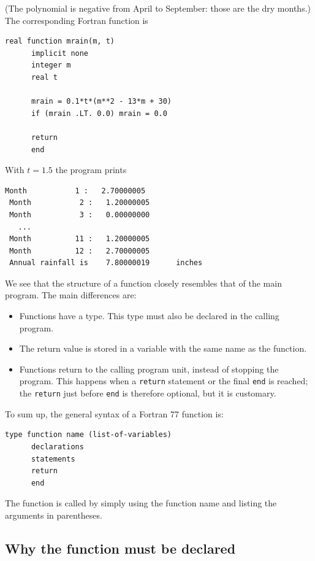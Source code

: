 (The polynomial is negative from April to September: those are the dry months.) The corresponding Fortran function is

\begin{lstlisting}[style=fortran77]
      real function mrain(m, t)
      implicit none
      integer m
      real t

      mrain = 0.1*t*(m**2 - 13*m + 30)
      if (mrain .LT. 0.0) mrain = 0.0

      return
      end
\end{lstlisting}

With $t = 1.5$ the program prints

\begin{lstlisting}[style=output]
 Month           1 :   2.70000005
 Month           2 :   1.20000005
 Month           3 :   0.00000000
   ...
 Month          11 :   1.20000005
 Month          12 :   2.70000005
 Annual rainfall is    7.80000019      inches
\end{lstlisting}

We see that the structure of a function closely resembles that of the main program. The main differences are:

\begin{itemize}
    \item Functions have a type. This type must also be declared in the calling program.
    \item The return value is stored in a variable with the same name as the function.
    \item Functions return to the calling program unit, instead of stopping the program. This happens when a \texttt{return} statement or the final \texttt{end} is reached; the \texttt{return} just before \texttt{end} is therefore optional, but it is customary.
\end{itemize}

To sum up, the general syntax of a Fortran 77 function is:

\begin{lstlisting}[style=fortran77]
      type function name (list-of-variables)
      declarations
      statements
      return
      end
\end{lstlisting}

The function is called by simply using the function name and listing the arguments in parentheses.

\subsection{Why the function must be declared}

